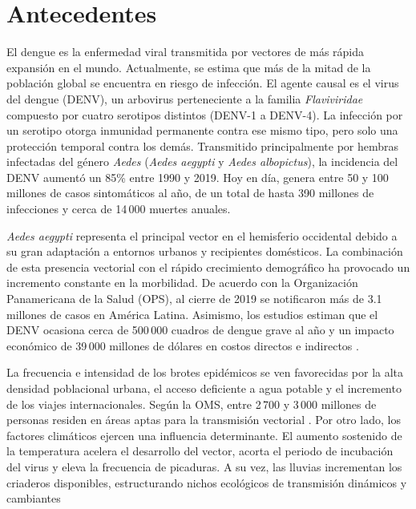 \titleformat{\chapter}[display]
  {\normalfont\bfseries}{}{0pt}{\Large} %
\chapter{Antecedentes}
El dengue es la enfermedad viral transmitida por vectores de más rápida expansión en el mundo. Actualmente, se estima que más de la mitad de la población global se encuentra en riesgo de infección. El agente causal es el virus del dengue (DENV), un arbovirus perteneciente a la familia \textit{Flaviviridae} compuesto por cuatro serotipos distintos (DENV-1 a DENV-4). La infección por un serotipo otorga inmunidad permanente contra ese mismo tipo, pero solo una protección temporal contra los demás. Transmitido principalmente por hembras infectadas del género \textit{Aedes} (\textit{Aedes aegypti} y \textit{Aedes albopictus}), la incidencia del DENV aumentó un 85\% entre 1990 y 2019. Hoy en día, genera entre 50 y 100 millones de casos sintomáticos al año, de un total de hasta 390 millones de infecciones y cerca de 14\,000 muertes anuales. 

\textit{Aedes aegypti} representa el principal vector en el hemisferio occidental debido a su gran adaptación a entornos urbanos y recipientes domésticos. La combinación de esta presencia vectorial con el rápido crecimiento demográfico ha provocado un incremento constante en la morbilidad. De acuerdo con la Organización Panamericana de la Salud (OPS), al cierre de 2019 se notificaron más de 3.1 millones de casos en América Latina. Asimismo, los estudios estiman que el DENV ocasiona cerca de 500\,000 cuadros de dengue grave al año y un impacto económico de 39\,000 millones de dólares en costos directos e indirectos \cite{contreras2021aspectos}.

La frecuencia e intensidad de los brotes epidémicos se ven favorecidas por la alta densidad poblacional urbana, el acceso deficiente a agua potable y el incremento de los viajes internacionales. Según la OMS, entre 2\,700 y 3\,000 millones de personas residen en áreas aptas para la transmisión vectorial \cite{krishna2024dengue}. Por otro lado, los factores climáticos ejercen una influencia determinante. El aumento sostenido de la temperatura acelera el desarrollo del vector, acorta el periodo de incubación del virus y eleva la frecuencia de picaduras. A su vez, las lluvias incrementan los criaderos disponibles, estructurando nichos ecológicos de transmisión dinámicos y cambiantes \cite{mendoza2025spatial} \newpage 

